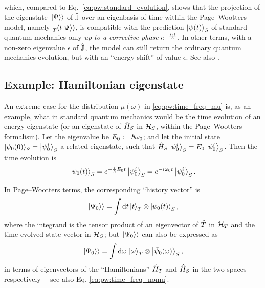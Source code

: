 which, compared to Eq.~\eqref{eq:pw:standard_evolution},
shows that the projection of the eigenstate $\left.\left| \Psi \right\rangle\right\rangle$ of $\hat{\mathbb{J}}$
over an eigenbasis of time within the Page--Wootters model,
namely $\prescript{}{T}{\!\left.\left\langle t \middle| \Psi \right\rangle\right\rangle}$,
is compatible with the prediction $\ket{\psi(t)}_S$ of standard quantum mechanics
only \emph{up to a corrective phase} $e^{-\frac{i \epsilon t}{\hbar}}$.
In other terms, with a non-zero eigenvalue $\epsilon$ of $\hat{\mathbb{J}}$,
the model can still return the ordinary quantum mechanics evolution, but
with an ``energy shift'' of value $\epsilon$.
See also \cite[\it ``The Zero-eigenvalue'']{Lloyd:Time}.

\subsection{Example: Hamiltonian eigenstate}\label{sec:pw:ex-hamiltonian-eigenstate}

An extreme case for the distribution %
$\mu(\omega)$ in \eqref{eq:pw:time_freq_mu} %
is, as an example, what in standard quantum mechanics would be the time evolution of an energy eigenstate
(or an eigenstate of $\hat{H}_S$ in $\mathcal{H}_S$, within the Page--Wootters formalism).
Let the eigenvalue be $E_0 \coloneqq \hbar\omega_{0}$;
and let the initial state $\ket{\psi_{0}(0)}_S = \ket{\psi_0^i}_S$ a related eigenstate,
such that $\hat{H}_{S}\ket{\psi_0^i}_S = E_{0}\ket{\psi_0^i}_S$.
Then the time evolution is
\begin{equation}\label{eq:pw:eigenevol}
  \ket{\psi_{0}(t)}_S = e^{-\frac{i}{\hbar}E_{0}t}\ket{\psi_0^i}_S = e^{-i \omega_{0} t}\ket{\psi_0^i}_S \text{.}
\end{equation}

In Page--Wootters terms, the corresponding ``history vector'' is
\begin{equation}\label{eq:pw:Psi_0_t}
  \left.\left| \Psi_0 \right\rangle\right\rangle = \int \dd{t} \ket{t}_T \otimes \ket{\psi_0(t)}_S \text{,}
\end{equation}
where the integrand is the tensor product of an eigenvector of $\hat{T}$ in $\mathcal{H}_T$
and the time-evolved state vector in $\mathcal{H}_S$;
but $\left.\left| \Psi_0 \right\rangle\right\rangle$ can also be expressed as
\begin{equation}\label{eq:pw:Psi_0_omega__int}
  \left.\left| \Psi_0 \right\rangle\right\rangle = \int \dd{\omega} \, \ket{\omega}_{T}\otimes\ket{\tilde{\psi}_{0}(\omega)}_{S} \text{,}
\end{equation}
in terms of eigenvectors of the ``Hamiltonians''
$\hat{H}_T$ and $\hat{H}_S$ in the two spaces respectively %
---see also Eq. \eqref{eq:pw:time_freq_nomu}.

